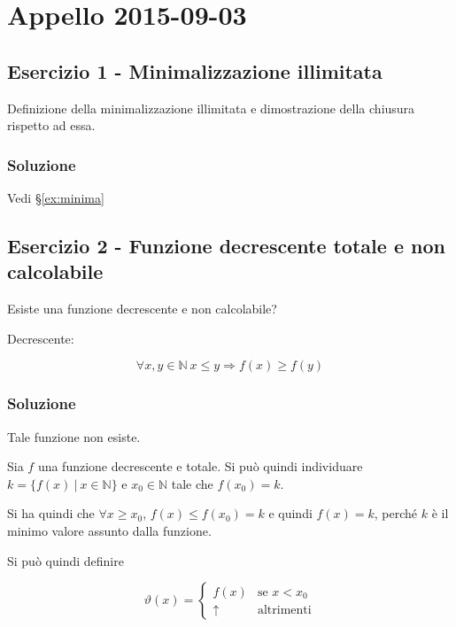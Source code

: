\section{Appello 2015-09-03}

\subsection{Esercizio 1 - Minimalizzazione illimitata}

Definizione della minimalizzazione illimitata e dimostrazione della chiusura rispetto ad essa.

\subsubsection{Soluzione}

Vedi §\ref{ex:minima}


\subsection{Esercizio 2 - Funzione decrescente totale e non calcolabile}

Esiste una funzione decrescente e non calcolabile?

Decrescente:

$$
\forall x,y \in \mathbb{N} \: x \leq y \Rightarrow f(x) \geq f(y) 
$$

\subsubsection{Soluzione}


Tale funzione non esiste.

Sia $f$ una funzione decrescente e totale. Si può quindi individuare $k = \{ f(x) \: | \: x \in \mathbb{N} \}$ e $x_0 \in \mathbb{N} $ tale che $f(x_0) = k$.

Si ha quindi che $\forall x \geq x_0$, $f(x) \leq f(x_0) = k $ e quindi $f(x) = k$, perché $k$ è il minimo valore assunto dalla funzione.

Si può quindi definire

$$
\vartheta(x) = \begin{cases}
f(x) &\text{se } x < x_0 \\
\uparrow &\text{altrimenti}
\end{cases}
$$

